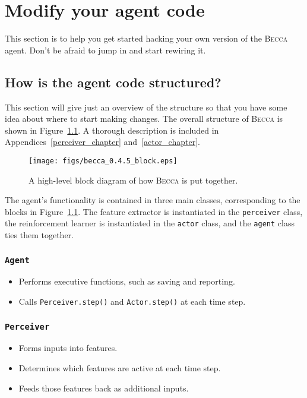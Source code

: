 \chapter{Modify your agent code}

This section is to help you get started hacking your own version of the \textsc{Becca} agent. Don't be afraid to jump in and start rewiring it.

\section{How is the agent code structured?}

This section will give just an overview of the structure so that you have some idea about where to start making changes. The overall structure of \textsc{Becca} is shown in Figure~\ref{becca_block}. A thorough description is included in Appendices~\ref{perceiver_chapter} and~\ref{actor_chapter}. 

\begin{figure}
\centering
\texttt{[image: figs/becca\_0.4.5\_block.eps]}
\caption{A high-level block diagram of how \textsc{Becca} is put together.}
\label{becca_block}
\end{figure}

The agent's functionality is contained in three main classes, corresponding to the blocks in Figure~\ref{becca_block}. The feature extractor is instantiated in the \texttt{perceiver} class, the reinforcement learner is instantiated in the \texttt{actor} class, and the \texttt{agent} class ties them together. 

\subsection{\texttt{Agent}}
\begin{itemize}
\item Performs executive functions, such as saving and reporting.
\item Calls \texttt{Perceiver.step()} and  \texttt{Actor.step()} at each time step.
\end{itemize}

\subsection{\texttt{Perceiver}}
\begin{itemize}
\item Forms inputs into features.
\item Determines which features are active at each time step.
\item Feeds those features back as additional inputs.
\end{itemize}

